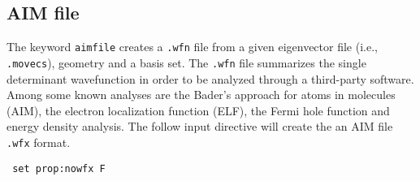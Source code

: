 \subsection{AIM file}
\label{sec:AIMfile}

The keyword {\tt aimfile} creates a \verb+.wfn+ file from a given 
eigenvector file (i.e., \verb+.movecs+), geometry and a basis set. 
The \verb+.wfn+ file summarizes the single determinant wavefunction in order to be analyzed 
through a third-party software.
Among some known analyses are the Bader's approach for atoms in molecules (AIM), the electron 
localization function (ELF), the Fermi hole function and energy density analysis.
The follow input directive will create the an AIM file \verb+.wfx+ format.
\begin{verbatim}
 set prop:nowfx F
\end{verbatim}
